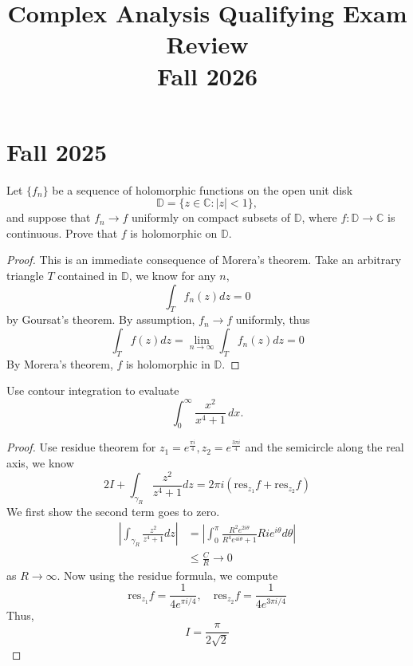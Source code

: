 \documentclass[openany]{book}
\title{Complex Analysis Qualifying Exam Review
\\ 
\vspace{0.4cm}
\large Fall 2026}
\newcommand{\D}{\mathbb{D}}
\begin{document}
\maketitle

\tableofcontents
\newpage





\chapter{Fall 2025}
\begin{prob}
Let $\{f_n\}$ be a sequence of holomorphic functions on the open unit disk
\[
\mathbb{D}=\{z\in\mathbb{C}:|z|<1\},
\]
and suppose that $f_n\to f$ uniformly on compact subsets of $\mathbb{D}$, where
$f:\mathbb{D}\to\mathbb{C}$ is continuous. Prove that $f$ is holomorphic on $\mathbb{D}$.
\end{prob}
\begin{proof}
    This is an immediate consequence of Morera's theorem. Take an arbitrary triangle $T$ contained in $\D$, we know for any $n$,
    \begin{equation*}
        \int_T f_n(z)dz=0
    \end{equation*}
    by Goursat's theorem. By assumption, $f_n\to f$ uniformly, thus 
    \begin{equation*}
        \int_T f(z)dz=\lim_{n\to\infty}\int_T f_n(z)dz=0
    \end{equation*}
    By Morera's theorem, $f$ is holomorphic in $\D$. 
\end{proof}

\begin{prob}
Use contour integration to evaluate
\[
\int_0^\infty \frac{x^2}{x^4+1}\,dx.
\]
\end{prob}
\begin{proof}
    Use residue theorem for $z_1=e^\frac{\pi i}{4}, z_2=e^\frac{3\pi i}{4}$ and the semicircle along the real axis, we know 
    \begin{equation*}
        2I+\int_{\gamma_R}\frac{z^2}{z^4+1}dz=2\pi i\left(\text{res}_{z_1}f+\text{res}_{z_2}f\right)
    \end{equation*}
    We first show the second term goes to zero.
    \begin{align*}
        \left|\int_{\gamma_R}\frac{z^2}{z^4+1}dz\right|&=\left|\int_0^{\pi}\frac{R^2e^{2i\theta}}{R^4e^{4i\theta}+1}Rie^{i\theta}d\theta\right|\\
        &\leq \frac{C}{R}\to 0
    \end{align*}
    as $R\to\infty$. Now using the residue formula, we compute 
    \begin{equation*}
        \text{res}_{z_1}f=\frac{1}{4e^{\pi i/4}}, \quad \text{res}_{z_2}f=\frac{1}{4e^{3\pi i/4}}
    \end{equation*}
    Thus, 
    \begin{equation*}
        I=\frac{\pi}{2\sqrt{2}}
    \end{equation*}
\end{proof}
\end{document}

